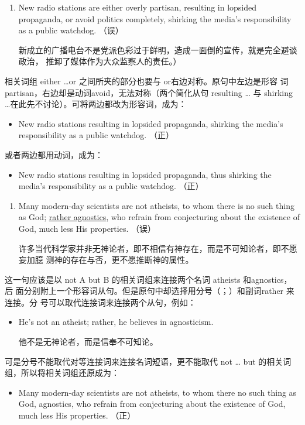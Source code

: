 \begin{enumerate}[resume]
\item New radio stations are either overly partisan, resulting in lopsided
  propaganda, or avoid politics completely, shirking the media's
  responsibility as a public watchdog. （误）

  新成立的广播电台不是党派色彩过于鲜明，造成一面倒的宣传，就是完全避谈政治，
  推卸了媒体作为大众监察人的责任。）
\end{enumerate}

相关词组 either \ldots or 之间所夹的部分也要与 or右边对称。原句中左边是形容
词 partisan，右边却是动词avoid，无法对称（两个简化从句 resulting
\ldots{} 与 shirking \ldots{}在此先不讨论）。可将两边都改为形容词，成为：
\begin{mybox}
\begin{itemize}
\item New radio stations  resulting in lopsided
  propaganda,  shirking the media's responsibility
  as a public watchdog. （正）
\end{itemize}
\end{mybox}
或者两边都用动词，成为：
\begin{mybox}
\begin{itemize}
\item New radio stations  resulting in
  lopsided propaganda,  thus shirking the
  media's responsibility as a public watchdog. （正）
\end{itemize}
\end{mybox}


\begin{enumerate}[resume]
\item Many modern-day scientists are not atheists, to whom there is no such
  thing as God; \ul{rather agnostics}, who refrain from conjecturing about the
  existence of God, much less His properties. （误）

  许多当代科学家并非无神论者，即不相信有神存在，而是不可知论者，即不愿妄加臆
  测神的存在与否，更不愿推断神的属性。
\end{enumerate}
这一句应该是以 not A but B 的相关词组来连接两个名词 atheists 和agnostics，后
面分别附上一个形容词从句。但是原句中却选择用分号（；）和副词rather 来连接。分
号可以取代连接词来连接两个从句，例如：
\begin{itemize}
\item He's not an atheist; rather, he believes in agnosticism.

  他不是无神论者，而是信奉不可知论。
\end{itemize}
可是分号不能取代对等连接词来连接名词短语，更不能取代 not \ldots{} but
的相关词组，所以将相关词组还原成为：
\begin{itemize}
\item Many modern-day scientists are not atheists, to whom there no such thing
  as God,  agnostics, who refrain from conjecturing about the existence
  of God, much less His properties. （正）
\end{itemize}

